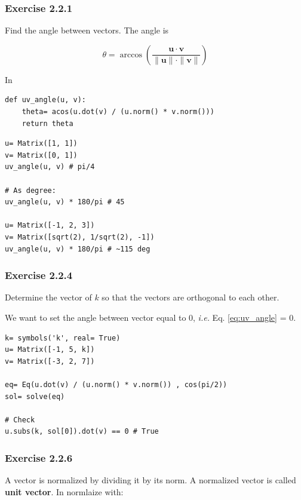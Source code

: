 \subsubsection{Exercise 2.2.1}

Find the angle between vectors. The angle is

\begin{equation}\label{eq:uv_angle}
\theta = \arccos(\frac{\mathbf{u} \cdot \mathbf{v}}
{\|\mathbf{u}\| \cdot \|\mathbf{v}\|})
\end{equation}

In \sympy

\begin{verbatim}
def uv_angle(u, v):
    theta= acos(u.dot(v) / (u.norm() * v.norm()))
    return theta
\end{verbatim}

\begin{verbatim}
u= Matrix([1, 1])
v= Matrix([0, 1])
uv_angle(u, v) # pi/4

# As degree:
uv_angle(u, v) * 180/pi # 45

u= Matrix([-1, 2, 3])
v= Matrix([sqrt(2), 1/sqrt(2), -1])
uv_angle(u, v) * 180/pi # ~115 deg
\end{verbatim}

\subsubsection{Exercise 2.2.4}
Determine the vector of $k$ so that the vectors are orthogonal to each other.

We want to set the angle between vector equal to 0, \emph{i.e.} Eq. \ref{eq:uv_angle} = 0.

\begin{verbatim}
k= symbols('k', real= True)
u= Matrix([-1, 5, k])
v= Matrix([-3, 2, 7])

eq= Eq(u.dot(v) / (u.norm() * v.norm()) , cos(pi/2))
sol= solve(eq)

# Check
u.subs(k, sol[0]).dot(v) == 0 # True
\end{verbatim}

\subsubsection{Exercise 2.2.6}

A vector is normalized by dividing it by its norm. A normalized vector is called
\textbf{unit vector}. In \sympy normlaize with:


